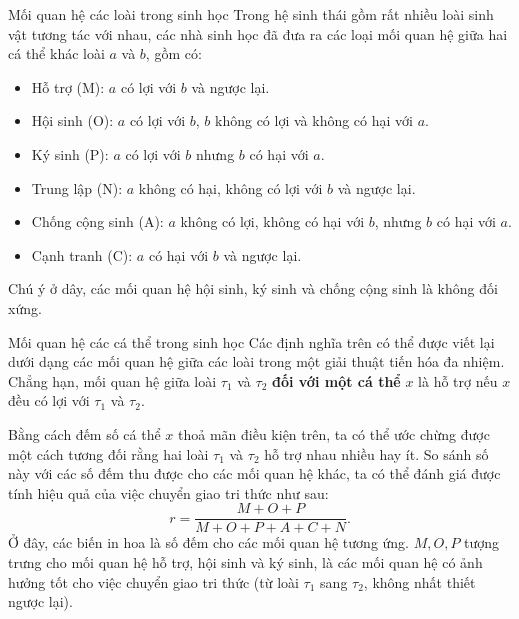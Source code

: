 \begin{frame}{Mối quan hệ các loài trong sinh học}
Trong hệ sinh thái gồm rất nhiều loài sinh vật tương tác với nhau, các nhà sinh
học đã đưa ra các loại mối quan hệ giữa hai cá thể khác loài \( a \) và \( b \),
gồm có:
\begin{itemize}
\item Hỗ trợ (M): \( a \) có lợi với \( b \) và ngược lại.
\item Hội sinh (O): \( a \) có lợi với \( b \), \( b \) không có lợi và không có
  hại với \( a \).
\item Ký sinh (P): \( a \) có lợi với \( b \) nhưng \( b \) có hại với \( a \).
\item Trung lập (N): \( a \) không có hại, không có lợi với \( b \) và ngược lại.
\item Chống cộng sinh (A): \( a \) không có lợi, không có hại với \( b \), nhưng \(
  b \) có hại với \( a \).
\item Cạnh tranh (C): \( a \) có hại với \( b \) và ngược lại.
\end{itemize}

Chú ý ở dây, các mối quan hệ hội sinh, ký sinh và chống cộng sinh là không đối
xứng.
\end{frame}

\begin{frame}{Mối quan hệ các cá thể trong sinh học}
Các định nghĩa trên có thể được viết lại dưới dạng các mối quan hệ giữa các loài
trong một giải thuật tiến hóa đa nhiệm. Chẳng hạn, mối quan hệ giữa
loài \( \tau_{1} \) và \( \tau_{2} \) \textbf{đối với một cá thể} \( x \) là
hỗ trợ nếu \( x \) đều có lợi với \( \tau_{1} \) và \( \tau_{2} \).

Bằng cách đếm số cá thể \( x \) thoả mãn điều kiện trên, ta có thể ước chừng
được một cách tương đối rằng hai loài \( \tau_{1} \) và \( \tau_{2}  \) hỗ trợ
nhau nhiều hay ít. So sánh số này với các số đếm thu được cho các mối quan hệ
khác, ta có thể đánh giá được tính hiệu quả của việc chuyển giao tri thức như
sau:
\[
  r = \frac{M + O + P}{M + O + P + A + C + N}
.\] 
Ở đây, các biến in hoa là số đếm cho các mối quan hệ tương ứng. \( M, O, P \)
tượng trưng cho mối quan hệ hỗ trợ, hội sinh và ký sinh, là các mối quan hệ có
ảnh hưởng tốt cho việc chuyển giao tri thức (từ loài \( \tau_{1} \) sang \(
\tau_{2}\), không nhất thiết ngược lại).
\end{frame}

